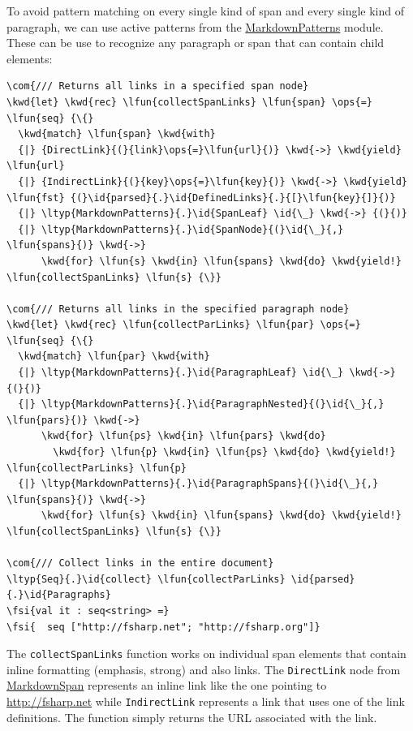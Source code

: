 \documentclass{article}
\newcommand{\id}[1]{\textcolor{black}{#1}}
\newcommand{\com}[1]{\textcolor{officegreen}{#1}}
\newcommand{\kwd}[1]{\textcolor{navy}{#1}}
\newcommand{\ops}[1]{\textcolor{purple}{#1}}
\newcommand{\fsi}[1]{\textcolor{outputcolor}{#1}}
\begin{document}
To avoid pattern matching on every single kind of span and every single kind of
paragraph, we can use active patterns from the \href{https://fsprojects.github.io/FSharp.Formatting/reference/fsharp-formatting-markdown-markdownpatterns.html}{MarkdownPatterns} module. These can be use
to recognize any paragraph or span that can contain child elements:
\begin{Verbatim}[commandchars=\\\{\}]
\com{/// Returns all links in a specified span node}
\kwd{let} \kwd{rec} \lfun{collectSpanLinks} \lfun{span} \ops{=} \lfun{seq} {\{}
  \kwd{match} \lfun{span} \kwd{with}
  {|} {DirectLink}{(}{link}\ops{=}\lfun{url}{)} \kwd{->} \kwd{yield} \lfun{url}
  {|} {IndirectLink}{(}{key}\ops{=}\lfun{key}{)} \kwd{->} \kwd{yield} \lfun{fst} {(}\id{parsed}{.}\id{DefinedLinks}{.}{[}\lfun{key}{]}{)}
  {|} \ltyp{MarkdownPatterns}{.}\id{SpanLeaf} \id{\_} \kwd{->} {(}{)}
  {|} \ltyp{MarkdownPatterns}{.}\id{SpanNode}{(}\id{\_}{,} \lfun{spans}{)} \kwd{->}
      \kwd{for} \lfun{s} \kwd{in} \lfun{spans} \kwd{do} \kwd{yield!} \lfun{collectSpanLinks} \lfun{s} {\}}
      
\com{/// Returns all links in the specified paragraph node}
\kwd{let} \kwd{rec} \lfun{collectParLinks} \lfun{par} \ops{=} \lfun{seq} {\{}
  \kwd{match} \lfun{par} \kwd{with}
  {|} \ltyp{MarkdownPatterns}{.}\id{ParagraphLeaf} \id{\_} \kwd{->} {(}{)}
  {|} \ltyp{MarkdownPatterns}{.}\id{ParagraphNested}{(}\id{\_}{,} \lfun{pars}{)} \kwd{->} 
      \kwd{for} \lfun{ps} \kwd{in} \lfun{pars} \kwd{do} 
        \kwd{for} \lfun{p} \kwd{in} \lfun{ps} \kwd{do} \kwd{yield!} \lfun{collectParLinks} \lfun{p} 
  {|} \ltyp{MarkdownPatterns}{.}\id{ParagraphSpans}{(}\id{\_}{,} \lfun{spans}{)} \kwd{->}
      \kwd{for} \lfun{s} \kwd{in} \lfun{spans} \kwd{do} \kwd{yield!} \lfun{collectSpanLinks} \lfun{s} {\}}

\com{/// Collect links in the entire document}
\ltyp{Seq}{.}\id{collect} \lfun{collectParLinks} \id{parsed}{.}\id{Paragraphs}
\fsi{val it : seq<string> =}
\fsi{  seq ["http://fsharp.net"; "http://fsharp.org"]}
\end{Verbatim}



The \texttt{collectSpanLinks} function works on individual span elements that contain inline
formatting (emphasis, strong) and also links. The \texttt{DirectLink} node from \href{https://fsprojects.github.io/FSharp.Formatting/reference/fsharp-formatting-markdown-markdownspan.html}{MarkdownSpan} represents an inline
link like the one pointing to \href{http://fsharp.net}{http://fsharp.net} while \texttt{IndirectLink} represents a
link that uses one of the link definitions. The function simply returns the URL associated
with the link.
\end{document}
